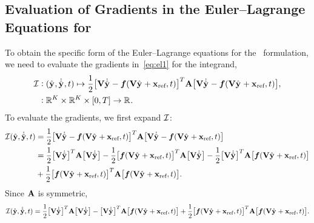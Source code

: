 \documentclass[3p,computermodern,10pt]{elsarticle}
\begin{document}
\begin{appendices}
\section{Evaluation of Gradients in the Euler--Lagrange Equations for \methodAcronym}\label{appendix:vector_calc} 
To obtain the specific form of the Euler--Lagrange equations for the \methodAcronym\ formulation, we need to evaluate the gradients in~\eqref{eq:el1} for the integrand,
\begin{align*}\label{eq:integrand_apx}
 \minintegrand & \vcentcolon
(\genstateyDiscreteArgnt{}, \genstateyDiscreteDotArgnt{} ,t) \mapsto \frac{1}{2} \big[
\basisspace \genstateyDiscreteDotArgnt{} - \velocity(\basisspace \genstateyDiscreteArgnt{}
+ \stateIntercept,t) \big]^T \stweightingMatArg{} \big[
\basisspace \genstateyDiscreteDotArgnt{}  - \velocity(\basisspace \genstateyDiscreteArgnt{} +
\stateIntercept,t) \big], \\ & 
\vcentcolon \RR{\romdim} \times \RR{\romdim} \times [0,T]
 \rightarrow \RR{} .  
\end{align*}
To evaluate the gradients, we first expand $\minintegrand$:
\begin{align*}
 \minintegrand(\genstateyDiscrete,\dot{\genstateyDiscrete},t)  &= \frac{1}{2} \big[ \basisspace \genstateyDiscreteDotArgnt{}  - \velocity(\basisspace \genstateyDiscreteArgnt{} + \stateIntercept,t) \big]^T \stweightingMatArg{n} \big[ \basisspace \genstateyDiscreteDotArgnt{} - \velocity(\veloargsromy) \big] \\ 
 &= \frac{1}{2}\big[\basisspace \genstateyDiscreteDotArgnt{}  \big]^T  \stweightingMatArg{n}  \big[\basisspace \genstateyDiscreteDotArgnt{} \big]  - \frac{1}{2}\big[ \velocity(\veloargsromy) \big]^T \stweightingMatArg{n}  \big[\basisspace \genstateyDiscreteDotArgnt{}\big] - \frac{1}{2} \big[ \basisspace \genstateyDiscreteDotArgnt{} \big]^T \stweightingMatArg{n} \big[ \velocity(\veloargsromy) \big]  \\ &+ \frac{1}{2}\big[\velocity(\veloargsromy) \big]^T \stweightingMatArg{n} \big[ \velocity(\veloargsromy) \big].
\end{align*}
Since $\stweightingMat$ is symmetric,
\begin{equation}\label{eq:int_expand}
 \minintegrand(\genstateyDiscrete,\genstateyDiscreteDot,t)  = \frac{1}{2}\big[\basisspace \genstateyDiscreteDotArgnt{}  \big]^T  \stweightingMatArg{n}  \big[ \basisspace \genstateyDiscreteDotArgnt{} \big]  -  \big[ \basisspace \genstateyDiscreteDotArgnt{} \big]^T \stweightingMatArg{n} \big[ \velocity(\veloargsromy) \big]  + \frac{1}{2}\big[\velocity(\veloargsromy) \big]^T \stweightingMatArg{n} \big[ \velocity(\veloargsromy) \big].

\end{equation}
\end{appendices}
\end{document}
